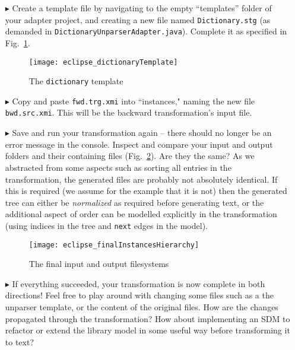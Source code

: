 \begin{itemize}
\item[$\blacktriangleright$] Create a template file by navigating to the empty ``templates'' folder of your adapter project, and creating a new file
named \texttt{Dictionary.stg} (as demanded in \texttt{Dict\-ion\-ary\-Un\-pars\-er\-Ad\-ap\-ter.java}). Complete it as specified in
Fig.~\ref{eclipse:dictionaryTemplate}.

\vspace{0.5cm}

\begin{figure}[htpb]
\begin{center}
  \texttt{[image: eclipse\_dictionaryTemplate]}
  \caption{The \texttt{dictionary} template}
  \label{eclipse:dictionaryTemplate}
\end{center}
\end{figure}

\item[$\blacktriangleright$] Copy and paste \texttt{fwd.trg.xmi} into ``instances," naming the new file \texttt{bwd.src.xmi}. This will be the backward
transformation's input file.

\item[$\blacktriangleright$] Save and run your transformation again -- there should no longer be an error message in the console. Inspect and compare your input
and output folders and their containing files (Fig.~\ref{eclipse:unparseResult}). 
Are they the same?  As we abstracted from some aspects such as sorting all entries in the transformation, the generated files are probably not absolutely identical.
If this is required (we assume for the example that it is not) then the generated tree can either be \emph{normalized} as required before generating text, or the additional aspect of order can be modelled explicitly in the transformation (using indices in the tree and \texttt{next} edges in the model).  


\clearpage

\begin{figure}[htpb]
\begin{center}
  \texttt{[image: eclipse\_finalInstancesHierarchy]}
  \caption{The final input and output filesystems}
  \label{eclipse:unparseResult}
\end{center}
\end{figure}

\item[$\blacktriangleright$] If everything succeeded, your transformation is now complete in both directions! Feel free to play around with
changing some files such as a the unparser template, or the content of the original files. How are the changes propagated through the transformation?
How about implementing an SDM to refactor or extend the library model in some useful way before transforming it to text?

\end{itemize}